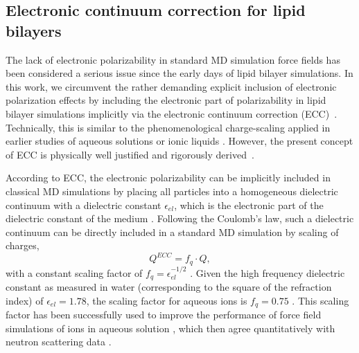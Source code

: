 \documentclass[aip,jcp,twocolumn]{revtex4}
\begin{document}
\subsection{Electronic continuum correction for lipid bilayers}\label{section:ecc}
The lack of electronic polarizability in standard MD simulation
force fields has been considered a serious issue since the early days of
lipid bilayer simulations.
In this work, we circumvent the rather demanding explicit inclusion
of electronic polarization effects \cite{lucas12,chowdhary13} by
including the electronic part of polarizability in lipid
bilayer simulations implicitly via 
the electronic continuum correction (ECC)~\cite{leontyev11}. 
Technically, this is similar to the phenomenological charge-scaling applied in 
earlier studies of aqueous solutions or ionic liquids \cite{jonsson86,egberts94}.
However, the present concept of ECC is
physically well justified and rigorously derived~\cite{leontyev09, leontyev10, leontyev11, leontyev14}.


According to ECC, the electronic
polarizability can be implicitly included in classical MD simulations by
placing all particles into a homogeneous dielectric continuum 
with a dielectric constant $\epsilon _{el}$, 
which is the electronic part of the dielectric constant of 
the medium \cite{leontyev11}. 
Following the Coulomb's law, such a dielectric continuum can be 
directly included in a standard MD simulation by
scaling of charges,
\begin{equation}
  Q^{ECC} = f_q \cdot Q ,
\end{equation}
with a constant scaling factor of $f_q = \epsilon _{el} ^{-1/2}$ 
. 
Given the  high frequency dielectric constant as measured in water (corresponding to the square of the refraction index) of  $\epsilon _{el} = 1.78$,  
the scaling factor for aqueous ions is $f_q = 0.75$ \cite{some_orig_source, leontyev11}. This scaling factor has been
successfully used to improve the performance of force field simulations of ions in aqueous solution \cite{kohagen14,kohagen16,??},
which then agree quantitatively with neutron scattering data \cite{kohagen14,kohagen16, Pluharova2014}. 
\end{document}

